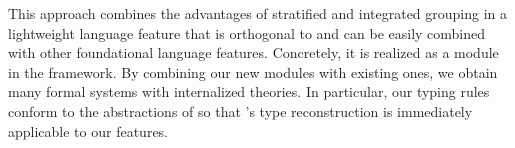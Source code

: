 This approach combines the advantages of stratified and integrated grouping in a lightweight language feature that is orthogonal to and can be easily combined with other foundational language features.
Concretely, it is realized as a module in the \mmt framework.
By combining our new modules with existing ones, we obtain many formal systems with internalized theories.
In particular, our typing rules conform to the abstractions of \mmt so that \mmt's type reconstruction \cite{rabe:recon:17} is immediately applicable to our features.

